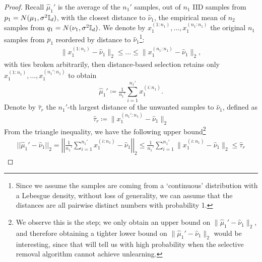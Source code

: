 \begin{proof}
Recall $\hat{\mu}_1'$ is the average of the $n_1'$ samples, out of $n_1$ IID samples from $p_1=N(\mu_1, \sigma^2\mathbb{I}_d)$, with the closest distance to $\hat{\nu}_1$, the empirical mean of $n_2$ samples from $q_1=N(\nu_1, \sigma^2\mathbb{I}_d)$.  
 We denote by $x_1^{(1:n_1)}, \ldots, x_1^{(n_1:n_1)}$ the original $n_1$ samples from $p_1$ reordered by distance to $\hat{\nu}_1$\footnote{Since we assume the samples are coming from a `continuous' distribution with a Lebesgue density, without loss of generality, we can assume that the distances are all pairwise distinct numbers with probability 1.}:
    \begin{align}
        \|x_1^{(1:n_1)} - \hat{\nu}_1\|_2
        \leq  \ldots \leq \|x_1^{(n_1:n_1)} - \hat{\nu}_1\|_2,
    \end{align}
    with ties broken arbitrarily, then distance-based selection retains only $x_1^{(1:n_1)}, \ldots, x_1^{(n_1':n_1)}$ to obtain
    \begin{equation}
        \label{eq:selectionG}
        \hat{\mu}_1' \coloneqq \tfrac{1}{n_1'} \sum_{i=1}^{n_1'} x_1^{(i:n_1)}.
    \end{equation}
    Denote by $\hat{\tau}_r$ the $n_1'$-th largest distance of the unwanted samples to $\hat{\nu}_1$, defined as 
    \begin{equation} \label{eq:tau}
         \hat{\tau}_r \coloneqq \|x_1^{(n_1':n_1)} - \hat{\nu}_1\|_2
    \end{equation}
    From the triangle inequality,  we have the following upper bound\footnote{We observe this is the step; we only obtain an upper bound on $\|\hat{\mu}_1' - \hat{\nu}_1\|_2$, and therefore obtaining a tighter lower bound on $\|\hat{\mu}_1' - \hat{\nu}_1\|_2$ would be interesting, since that will tell us with high probability when the selective removal algorithm cannot achieve unlearning.}
\begin{align*}
    ||\hat{\mu}_1' - \hat{\nu}_1||_2 
    = 
    \left|\left|\frac{1}{n_1'}\sum_{i=1}^{n_1'} x_1^{(i:n_1)} - \hat{\nu}_1\right|\right|_2 
    \leq
    \frac{1}{n_1'}\sum_{i=1}^{n_1'} \| x_1^{(i:n_1)} - \hat{\nu}_1\|_2  
    \leq
    \hat{\tau}_r
    \label{eq:distance-triangle}
\end{align*}


\end{proof}

